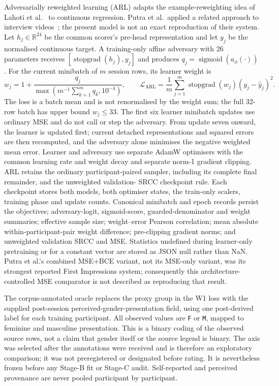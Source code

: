 Adversarially reweighted learning (ARL) adapts the example-reweighting idea of
Lahoti et al.~\cite{Lahoti2020} to continuous regression. Putra et al.\ applied a related
approach to interview videos~\cite{Putra2024}; the present model is not an exact reproduction
of their system. Let
$h_j\in\mathbb{R}^{24}$ be the common scorer's pre-head representation and let $y_j$ be the
normalised continuous target. A training-only affine adversary with 26 parameters receives
$[\operatorname{stopgrad}(h_j),y_j]$ and produces $q_j=\operatorname{sigmoid}(a_\phi(\cdot))$.
For the current minibatch of $m$ session rows, its learner weight is
\begin{equation}
    w_j=1+\frac{q_j}{\max\!\left(m^{-1}\sum_{k=1}^{m}q_k,10^{-4}\right)},
    \qquad
    \mathcal{L}_{\mathrm{ARL}}=\frac{1}{m}\sum_{j=1}^{m}
    \operatorname{stopgrad}(w_j)(y_j-\hat y_j)^2.
\end{equation}
The loss is a batch mean and is not renormalised by the weight sum; the full 32-row batch has
upper bound $w_j\leq33$. The first six learner minibatch updates use ordinary MSE and do not call
or step the adversary. From update seven onward, the learner is updated first; current detached
representations and squared errors are then recomputed, and the adversary alone minimises the
negative weighted mean error. Learner and adversary use separate AdamW optimisers with the common
learning rate and weight decay and separate norm-1 gradient clipping. ARL retains the ordinary
participant-paired sampler, including its complete final remainder, and the unweighted validation-
SRCC checkpoint rule. Each checkpoint stores both models, both optimiser states, the train-only
scalers, training phase and update counts. Canonical minibatch and epoch records persist the
objectives; adversary-logit, sigmoid-score, guarded-denominator and weight summaries; effective
sample size; weight--error Pearson correlation; mean absolute within-participant-pair weight
difference; pre-clipping gradient norms; and unweighted validation SRCC and MSE. Statistics
undefined during learner-only pretraining or for a constant vector are stored as JSON null rather
than NaN. Putra et al.'s combined MSE+BCE variant, not its MSE-only variant, was its strongest
reported First Impressions system; consequently this architecture-controlled MSE comparator is
not described as reproducing that result.

The corpus-annotated oracle replaces the proxy group in the W1 loss with the supplied
post-session perceived-gender-presentation field, using one post-derived label for each training
participant. All observed values are \texttt{F} or \texttt{M}, mapped to feminine and masculine
presentation. This is a binary coding of the observed source rows, not a claim that gender itself
or the source legend is binary. The axis was selected after the annotations were received and is
therefore an exploratory comparison; it was not preregistered or designated before rating. It is
nevertheless frozen before any Stage-B fit or Stage-C audit. Self-reported and perceived
provenance are never pooled participant by participant.

